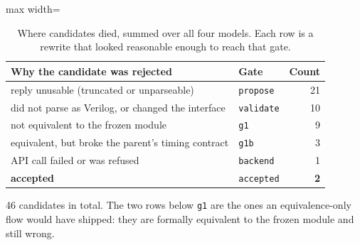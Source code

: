 \begin{table}[htbp]
  \centering
  \footnotesize
  \caption{Where candidates died, summed over all four models. Each row is a rewrite that looked reasonable enough to reach that gate.}
  \label{tab:funnel}
  \begin{adjustbox}{max width=\textwidth}
  \begin{tabular}{llr}
    \toprule
    \textbf{Why the candidate was rejected} & \textbf{Gate} & \textbf{Count} \\
    \midrule
    reply unusable (truncated or unparseable) & \texttt{propose} & 21 \\
    did not parse as Verilog, or changed the interface & \texttt{validate} & 10 \\
    not equivalent to the frozen module & \texttt{g1} & 9 \\
    equivalent, but broke the parent's timing contract & \texttt{g1b} & 3 \\
    API call failed or was refused & \texttt{backend} & 1 \\
    \textbf{accepted} & \texttt{accepted} & \textbf{2} \\
    \bottomrule
  \end{tabular}
  \end{adjustbox}
  \par\smallskip\footnotesize\raggedright 46 candidates in total. The two rows below \texttt{g1} are the ones an equivalence-only flow would have shipped: they are formally equivalent to the frozen module and still wrong.
\end{table}

